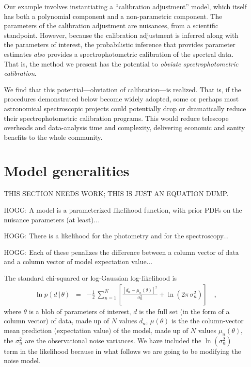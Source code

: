 \documentclass[iop,numberedappendix]{emulateapj}
\newcommand{\given}{\,|\,}
\begin{document}
Our example involves instantiating a ``calibration adjustment'' model,
which itself has both a polynomial component and a non-parametric
component.
The parameters of the calibration adjustment are nuisances, from a
scientific standpoint.
However, because the calibration adjustment is inferred along with the
parameters of interest, the probabilistic inference that provides
parameter estimates \emph{also} provides a spectrophotometric
calibration of the spectral data.
That is, the method we present has the potential to \emph{obviate
spectrophotometric calibration}.

We find that this potential---obviation of calibration---is realized.
That is, if the procedures demonstrated below become widely adopted,
some or perhaps most astronomical spectroscopic projects could
potentially drop or dramatically reduce their spectrophotometric
calibration programs.
This would reduce telescope overheads and data-analysis time and
complexity, delivering economic and sanity benefits to the whole
community.

\section{Model generalities}

THIS SECTION NEEDS WORK; THIS IS JUST AN EQUATION DUMP.

HOGG: A model is a parameterized likelihood function, with prior PDFs on the nuisance parameters (at least)...

HOGG: There is a likelihood for the photometry and for the spectroscopy...

HOGG: Each of these penalizes the difference between a column vector of data and a column vector of model expectation value...

The standard chi-squared or log-Gaussian log-likelihood is
\begin{eqnarray}
\ln p(d\given\theta) &=& -\frac{1}{2}\,\sum_{n=1}^N \left[\frac{[d_n - \mu_n(\theta)]^2}{\sigma_n^2} + \ln(2\pi\,\sigma_n^2) \right]
\quad ,
\end{eqnarray}
where $\theta$ is a blob of parameters of interest,
$d$ is the full set (in the form of a column vector) of data,
made up of $N$ values $d_n$,
$\mu(\theta)$ is the the column-vector mean prediction (expectation value) of the model,
made up of $N$ values $\mu_n(\theta)$,
the $\sigma_n^2$ are the observational noise variances.
We have included the $\ln(\sigma_n^2)$ term in the likelihood because
in what follows we are going to be modifying the noise model.
\end{document}
